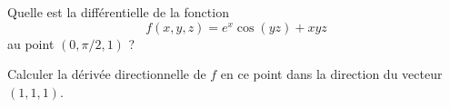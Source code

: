 
\begin{exercice}\label{exoOutilsMath-0055}

    Quelle est la différentielle de la fonction
    \begin{equation}
        f(x,y,z)= e^{x}\cos(yz)+xyz
    \end{equation}
    au point $(0,\pi/2,1)$ ?

    Calculer la dérivée directionnelle de $f$ en ce point dans la direction du vecteur $(1,1,1)$.

\end{exercice}
